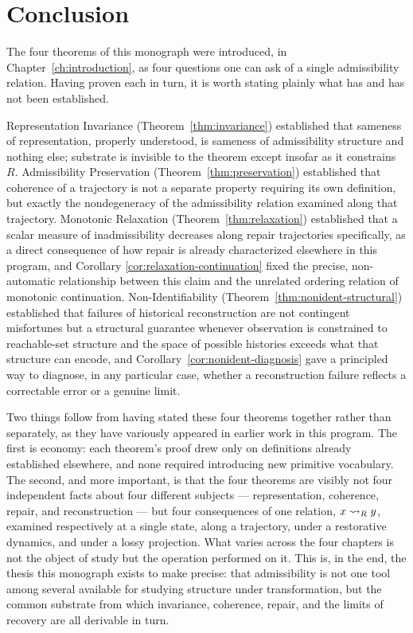 \chapter{Conclusion}
\label{ch:conclusion}

The four theorems of this monograph were introduced, in
Chapter~\ref{ch:introduction}, as four questions one can ask of a single
admissibility relation. Having proven each in turn, it is worth stating
plainly what has and has not been established.

Representation Invariance (Theorem~\ref{thm:invariance}) established
that sameness of representation, properly understood, is sameness of
admissibility structure and nothing else; substrate is invisible to the
theorem except insofar as it constrains $R$. Admissibility Preservation
(Theorem~\ref{thm:preservation}) established that coherence of a
trajectory is not a separate property requiring its own definition, but
exactly the nondegeneracy of the admissibility relation examined along
that trajectory. Monotonic Relaxation (Theorem~\ref{thm:relaxation})
established that a scalar measure of inadmissibility decreases along
repair trajectories specifically, as a direct consequence of how repair
is already characterized elsewhere in this program, and Corollary
\ref{cor:relaxation-continuation} fixed the precise, non-automatic
relationship between this claim and the unrelated ordering relation of
monotonic continuation. Non-Identifiability
(Theorem~\ref{thm:nonident-structural}) established that failures of
historical reconstruction are not contingent misfortunes but a
structural guarantee whenever observation is constrained to reachable-set
structure and the space of possible histories exceeds what that
structure can encode, and Corollary~\ref{cor:nonident-diagnosis} gave a
principled way to diagnose, in any particular case, whether a
reconstruction failure reflects a correctable error or a genuine limit.

Two things follow from having stated these four theorems together rather
than separately, as they have variously appeared in earlier work in this
program. The first is economy: each theorem's proof drew only on
definitions already established elsewhere, and none required
introducing new primitive vocabulary. The second, and more important, is
that the four theorems are visibly not four independent facts about four
different subjects --- representation, coherence, repair, and
reconstruction --- but four consequences of one relation, $x \rightsquigarrow_{R} y$,
examined respectively at a single state, along a trajectory, under a
restorative dynamics, and under a lossy projection. What varies across
the four chapters is not the object of study but the operation performed
on it. This is, in the end, the thesis this monograph exists to make
precise: that admissibility is not one tool among several available for
studying structure under transformation, but the common substrate from
which invariance, coherence, repair, and the limits of recovery are all
derivable in turn.
